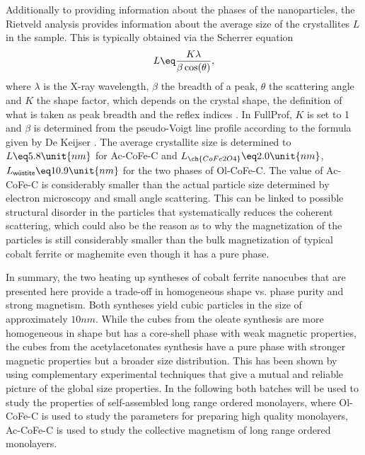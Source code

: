 \documentclass[\main/dresen_thesis.tex]{subfiles}
\begin{document}
    Additionally to providing information about the phases of the nanoparticles, the Rietveld analysis provides information about the average size of the crystallites $L$ in the sample.
    This is typically obtained via the Scherrer equation
    \begin{equation}
      L \eq \frac{K \lambda}{\beta \cos(\theta)},
    \end{equation}
    where $\lambda$ is the X-ray wavelength, $\beta$ the breadth of a peak, $\theta$ the scattering angle and $K$ the shape factor, which depends on the crystal shape, the definition of what is taken as peak breadth and the reflex indices \cite{Langford_1978_Scher}.
    In FullProf, $K$ is set to 1 and $\beta$ is determined from the pseudo-Voigt line profile according to the formula given by De Keijser \cite{DeKeijser_1982_Useof}.
    The average crystallite size is determined to $L \eq 5.8 \unit{nm}$ for Ac-CoFe-C and $L_{\ch{CoFe2O4}} \eq 2.0 \unit{nm}$, $L_{\textsf{w\"ustite}} \eq 10.9 \unit{nm}$ for the two phases of Ol-CoFe-C.
    The value of Ac-CoFe-C is considerably smaller than the actual particle size determined by electron microscopy and small angle scattering.
    This can be linked to possible structural disorder in the particles that systematically reduces the coherent scattering, which could also be the reason as to why the magnetization of the particles is still considerably smaller than the bulk magnetization of typical cobalt ferrite or maghemite even though it has a pure phase.

    In summary, the two heating up syntheses of cobalt ferrite nanocubes that are presented here provide a trade-off in homogeneous shape vs. phase purity and strong magnetism.
    Both syntheses yield cubic particles in the size of approximately $10 \unit{nm}$.
    While the cubes from the oleate synthesis are more homogeneous in shape but has a core-shell phase with weak magnetic properties, the cubes from the acetylacetonates synthesis have a pure phase with stronger magnetic properties but a broader size distribution.
    This has been shown by using complementary experimental techniques that give a mutual and reliable picture of the global size properties.
    In the following both batches will be used to study the properties of self-assembled long range ordered monolayers, where Ol-CoFe-C is used to study the parameters for preparing high quality monolayers, Ac-CoFe-C is used to study the collective magnetism of long range ordered monolayers.
\end{document}
